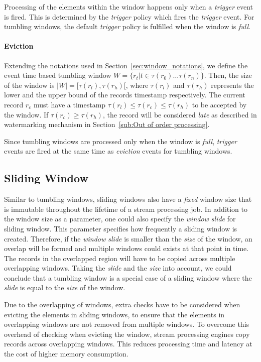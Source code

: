 Processing of the elements within the window happens only when a \emph{trigger}
event is fired. This is determined by the \emph{trigger} policy which fires the 
\emph{trigger} event. For tumbling windows, the default \emph{trigger} policy is 
fulfilled when the window is \emph{full}.


\paragraph{Eviction}%
Extending the notations used in Section~\ref{sec:window_notations}, we define 
the event time based tumbling window $W = \{r_t |  t \in \tau(r_0) \dots \tau(r_n) \}$. 
Then, the size of the window is $|W| = [\tau(r_l), \tau(r_h)[$, where  
$\tau(r_l)$ and $\tau(r_h)$ represents the lower and the upper bound of the 
records timestamp respectively. 
The current record $r_c$ must have a timestamp  $\tau(r_l) \le \tau(r_c) \le \tau(r_h)$ 
to be accepted by the window. If $\tau(r_c) \ge \tau(r_h)$, the record will be 
considered \emph{late} as described in watermarking mechanism in Section~\ref{sub:Out of order processing}. 


Since tumbling windows are processed only when the window is \emph{full}, \emph{trigger} events 
are fired at the same time as \emph{eviction} events for tumbling windows.


\subsection{Sliding Window}%
\label{sec:Sliding Window}
Similar to tumbling windows, sliding windows also have a \emph{fixed} window size 
that is immutable throughout the lifetime of a stream processing job. 
In addition to the window size as a parameter, one could also specify the 
\emph{window slide} for sliding window. This parameter specifies how frequently 
a sliding window is created. 
Therefore, if the \emph{window slide} is smaller 
than the \emph{size} of the window, an overlap will be formed and multiple 
windows could exists at that point in time. The records in the overlapped region 
will have to be copied across multiple overlapping windows. 
Taking the \emph{slide} and the \emph{size} into account, we could conclude that 
a tumbling window is a special case of a sliding window where the \emph{slide} is 
equal to the \emph{size} of the window.

Due to the overlapping of windows, extra checks have to be considered 
when evicting the elements in sliding windows, to ensure that the elements in 
overlapping windows are not removed from multiple windows. To overcome this overhead 
of checking when evicting the window, 
stream processing engines copy records across overlapping windows. 
This reduces processing time and latency at the cost of higher memory consumption.

